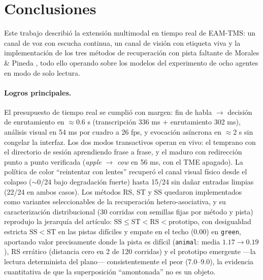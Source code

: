\section{Conclusiones}
\label{sec:conclusiones}

Este trabajo describió la extensión multimodal en tiempo real de EAM-TMS: un canal de
voz con escucha continua, un canal de visión con etiqueta viva y la implementación de
los tres métodos de recuperación con pista faltante de Morales \& Pineda
\cite{morales2025missing}, todo ello operando sobre los modelos del experimento de
ocho agentes en modo de solo lectura.

\paragraph{Logros principales.}
El presupuesto de tiempo real se cumplió con margen: fin de habla $\to$ decisión de
enrutamiento en $\approx$0.6 s (transcripción 336 ms $+$ enrutamiento 302 ms),
análisis visual en 54 ms por cuadro a 26 fps, y evocación asíncrona en $\approx$2 s
sin congelar la interfaz.
Los dos modos transactivos operan en vivo: el temprano con el directorio de sesión
aprendiendo frase a frase, y el maduro con redirección punto a punto verificada
(\textit{apple} $\to$ \textit{cow} en 56 ms, con el TME apagado).
La política de color ``reintentar con lentes'' recuperó el canal visual físico desde
el colapso ($\sim$0/24 bajo degradación fuerte) hasta 15/24 sin dañar entradas limpias
(22/24 en ambos casos).
Los métodos RS, ST y SS quedaron implementados como variantes seleccionables de la
recuperación hetero-asociativa, y su caracterización distribucional (30 corridas con
semillas fijas por método y pista) reprodujo la jerarquía del artículo:
$\mathrm{SS} \le \mathrm{ST} < \mathrm{RS} < \text{prototipo}$, con desigualdad
estricta $\mathrm{SS} < \mathrm{ST}$ en las pistas difíciles y empate en el techo
($0.00$) en \texttt{green}, aportando valor precisamente donde la pista es difícil
(\texttt{animal}: media $1.17 \to 0.19$), RS errático (distancia cero en 2 de 120
corridas) y el prototipo emergente ---la lectura determinista del plano---
consistentemente el peor (7.0--9.0), la evidencia cuantitativa de que la
superposición ``amontonada'' no es un objeto.

